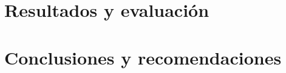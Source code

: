 \documentclass[12pt,openany]{MIA-USA}
\begin{document}
    \chapter{Resultados y evaluaci\'on}
    \label{cap:resultados}
    
    
    \chapter{Conclusiones y recomendaciones}
    \label{cap:conclusiones}
    
    
    
    \appendix
    
    
    
    
 	
\end{document}
